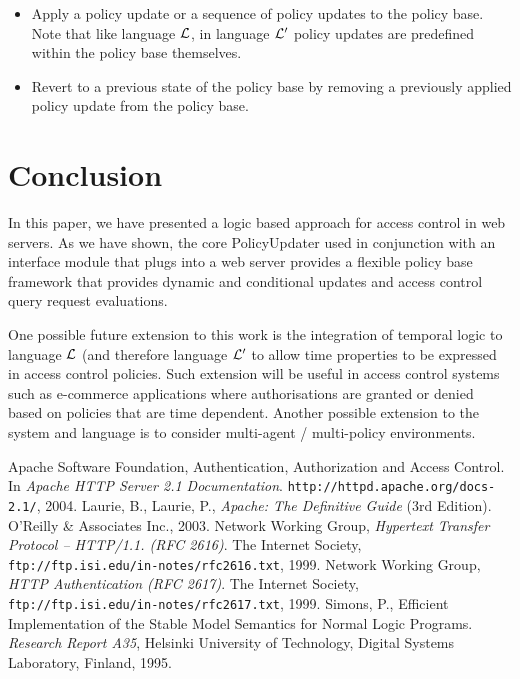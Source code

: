 \documentclass[11pt]{llncs}
\begin{document}
        \begin{itemize}
          \item
            Apply a policy update or a sequence of policy updates to the policy
            base. Note that like language ${\cal L}$, in language ${\cal L'}$
            policy updates are predefined within the policy base themselves.
          \vspace{1mm}
          \item
            Revert to a previous state of the policy base by removing a
            previously applied policy update from the policy base.
        \end{itemize}

  \section{Conclusion}
     \label{conclusion}

    In this paper, we have presented a logic based approach for access control
    in web servers. As we have shown, the core PolicyUpdater used in conjunction
    with an interface module that plugs into a web server provides a flexible
    policy base framework that provides dynamic and conditional updates and
    access control query request evaluations.

    One possible future extension to this work is the integration of temporal
    logic to language ${\cal L}$ (and therefore language ${\cal L'}$ to allow
    time properties to be expressed in access control policies. Such extension
    will be useful in access control systems such as e-commerce applications
    where authorisations are granted or denied based on policies that are time
    dependent. Another possible extension to the system and language is to
    consider multi-agent / multi-policy environments.

  \begin{thebibliography}{5}
      Apache Software Foundation,
      Authentication, Authorization and Access Control.
      In {\em Apache HTTP Server 2.1 Documentation}.
      {\tt http://httpd.apache.org/docs-2.1/}, 2004.
      Laurie, B., Laurie, P.,
      {\em Apache: The Definitive Guide} (3rd Edition).
      O'Reilly \& Associates Inc., 2003.
      Network Working Group,
      {\em Hypertext Transfer Protocol -- HTTP/1.1. (RFC 2616)}.
      The Internet Society,
      {\tt ftp://ftp.isi.edu/in-notes/rfc2616.txt}, 1999.
      Network Working Group,
      {\em HTTP Authentication (RFC 2617)}.
      The Internet Society,
      {\tt ftp://ftp.isi.edu/in-notes/rfc2617.txt}, 1999.
      Simons, P.,
      Efficient Implementation of the Stable Model Semantics for Normal Logic
      Programs.
      {\em Research Report A35},
      Helsinki University of Technology, Digital Systems Laboratory,
      Finland, 1995.

  \end{thebibliography}
\end{document}
